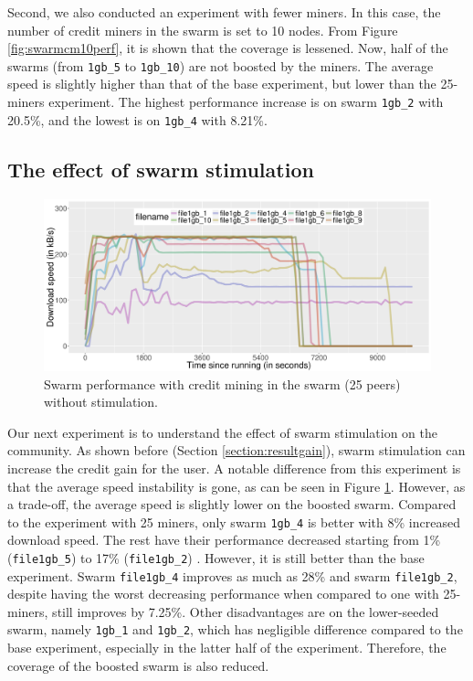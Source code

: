 Second, we also conducted an experiment with fewer miners. In this case, the number of credit miners in the swarm is set to 10 nodes. From Figure \ref{fig:swarmcm10perf}, it is shown that the coverage is lessened. Now, half of the swarms (from \texttt{1gb\_5} to \texttt{1gb\_10}) are not boosted by the miners. The average speed is slightly higher than that of the base experiment, but lower than the 25-miners experiment. The highest performance increase is on swarm \texttt{1gb\_2} with 20.5\%, and the lowest is on \texttt{1gb\_4} with 8.21\%.


\subsection{The effect of swarm stimulation}
\begin{figure}[h!]
	\centering
	\includegraphics[width=\textwidth]{pics/results/swperf_sc1_notrig.png}
	\caption{Swarm performance with credit mining in the swarm (25 peers) without stimulation.}
	\label{fig:swarmcm25perfnotrig}
\end{figure}

Our next experiment is to understand the effect of swarm stimulation on the community. As shown before (Section \ref{section:resultgain}), swarm stimulation can increase the credit gain for the user. A notable difference from this experiment is that the average speed instability is gone, as can be seen in Figure \ref{fig:swarmcm25perfnotrig}. However, as a trade-off, the average speed is slightly lower on the boosted swarm. Compared to the experiment with 25 miners, only swarm \texttt{1gb\_4} is better with 8\% increased download speed. The rest have their performance decreased starting from 1\% (\texttt{file1gb\_5}) to 17\% (\texttt{file1gb\_2}) . However, it is still better than the base experiment. Swarm \texttt{file1gb\_4} improves as much as 28\% and swarm \texttt{file1gb\_2}, despite having the worst decreasing performance when compared to one with 25-miners, still improves by 7.25\%. Other disadvantages are on the lower-seeded swarm, namely \texttt{1gb\_1} and \texttt{1gb\_2}, which has negligible difference compared to the base experiment, especially in the latter half of the experiment. Therefore, the coverage of the boosted swarm is also reduced. 

